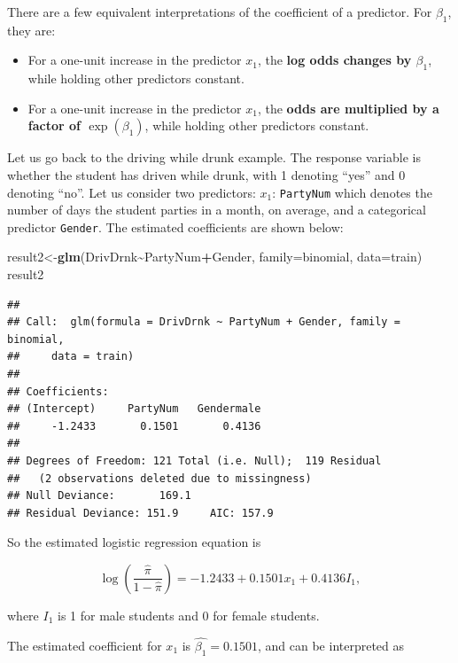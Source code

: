 \documentclass[
]{book}
\newenvironment{Shaded}{\begin{snugshade}}{\end{snugshade}}
\newcommand{\AttributeTok}[1]{\textcolor[rgb]{0.13,0.29,0.53}{#1}}
\newcommand{\FunctionTok}[1]{\textcolor[rgb]{0.13,0.29,0.53}{\textbf{#1}}}
\newcommand{\NormalTok}[1]{#1}
\newcommand{\OtherTok}[1]{\textcolor[rgb]{0.56,0.35,0.01}{#1}}
\newcommand{\SpecialCharTok}[1]{\textcolor[rgb]{0.81,0.36,0.00}{\textbf{#1}}}
\providecommand{\tightlist}{%
  \setlength{\itemsep}{0pt}\setlength{\parskip}{0pt}}
\begin{document}
There are a few equivalent interpretations of the coefficient of a predictor. For \(\beta_1\), they are:

\begin{itemize}
\tightlist
\item
  For a one-unit increase in the predictor \(x_1\), the \textbf{log odds changes by \(\beta_1\)}, while holding other predictors constant.
\item
  For a one-unit increase in the predictor \(x_1\), the \textbf{odds are multiplied by a factor of \(\exp(\beta_1)\)}, while holding other predictors constant.
\end{itemize}

Let us go back to the driving while drunk example. The response variable is whether the student has driven while drunk, with 1 denoting ``yes'' and 0 denoting ``no''. Let us consider two predictors: \(x_1\): \texttt{PartyNum} which denotes the number of days the student parties in a month, on average, and a categorical predictor \texttt{Gender}. The estimated coefficients are shown below:

\begin{Shaded}
\begin{Highlighting}[]
\NormalTok{result2}\OtherTok{\textless{}{-}}\FunctionTok{glm}\NormalTok{(DrivDrnk}\SpecialCharTok{\textasciitilde{}}\NormalTok{PartyNum}\SpecialCharTok{+}\NormalTok{Gender, }\AttributeTok{family=}\NormalTok{binomial, }\AttributeTok{data=}\NormalTok{train)}
\NormalTok{result2}
\end{Highlighting}
\end{Shaded}

\begin{verbatim}
## 
## Call:  glm(formula = DrivDrnk ~ PartyNum + Gender, family = binomial, 
##     data = train)
## 
## Coefficients:
## (Intercept)     PartyNum   Gendermale  
##     -1.2433       0.1501       0.4136  
## 
## Degrees of Freedom: 121 Total (i.e. Null);  119 Residual
##   (2 observations deleted due to missingness)
## Null Deviance:       169.1 
## Residual Deviance: 151.9     AIC: 157.9
\end{verbatim}

So the estimated logistic regression equation is

\[
\log \left( \frac{\hat{\pi}}{1-\hat{\pi}} \right) = -1.2433 + 0.1501x_1 + 0.4136I_1,
\]

where \(I_1\) is 1 for male students and 0 for female students.

The estimated coefficient for \(x_1\) is \(\hat{\beta_1} = 0.1501\), and can be interpreted as
\end{document}

